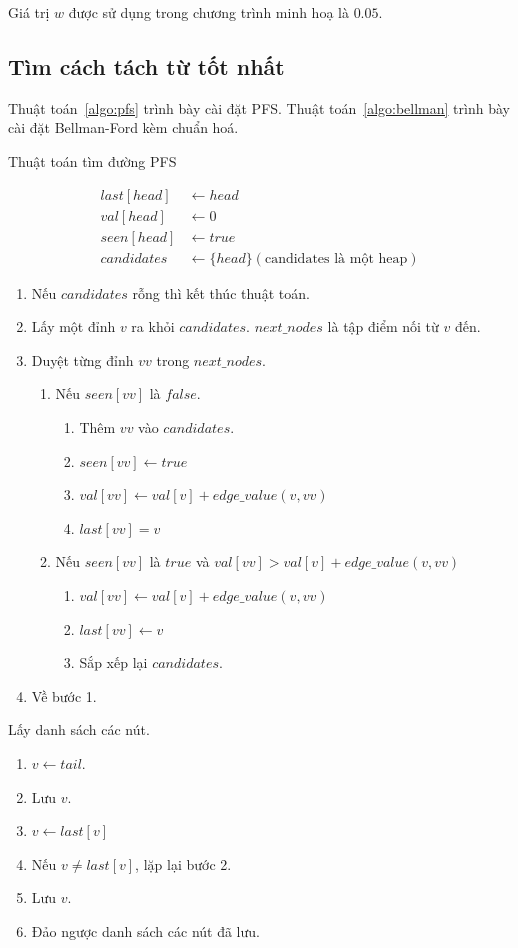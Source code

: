 \documentclass[a4paper,oneside,14pt]{extbook} %
\begin{document}
Giá trị $w$ được sử dụng trong chương trình minh hoạ là $0.05$. 


\subsection{Tìm cách tách từ tốt nhất}


Thuật toán~\ref{algo:pfs} trình bày cài đặt PFS. 
Thuật toán~\ref{algo:bellman} trình bày cài đặt Bellman-Ford kèm chuẩn hoá.


\begin{algo}
  \caption{Thuật toán tìm đường PFS}
  \label{algo:pfs}
  \begin{align*}
    last[head] &\leftarrow head\\
    val[head] &\leftarrow 0\\
    seen[head] &\leftarrow true\\
    candidates &\leftarrow \{ head \} (\text{candidates là một heap})
  \end{align*}

  \begin{enumerate}
  \item Nếu $candidates$ rỗng thì kết thúc thuật toán.
  \item Lấy một đỉnh $v$ ra khỏi $candidates$. $next\_nodes$ là tập điểm
    nối từ $v$ đến.
  \item Duyệt từng đỉnh $vv$ trong $next\_nodes$.
    \begin{enumerate}
    \item Nếu $seen[vv]$ là $false$.
      \begin{enumerate}
      \item Thêm $vv$ vào $candidates$.
      \item $seen[vv] \leftarrow true$
      \item $val[vv] \leftarrow val[v]+edge\_value(v,vv)$
      \item $last[vv] = v$
      \end{enumerate}
    \item Nếu $seen[vv]$ là $true$ và $val[vv] > val[v]+edge\_value(v,vv)$
      \begin{enumerate}
      \item $val[vv] \leftarrow val[v]+edge\_value(v,vv)$
      \item $last[vv] \leftarrow v$
      \item Sắp xếp lại $candidates$.
      \end{enumerate}
    \end{enumerate}
  \item Về bước 1.
  \end{enumerate}

Lấy danh sách các nút.
  \begin{enumerate}
  \item $v \leftarrow tail$.
  \item Lưu $v$.
  \item $v \leftarrow last[v]$
  \item Nếu $v \ne last[v]$, lặp lại bước 2.
  \item Lưu $v$.
  \item Đảo ngược danh sách các nút đã lưu.
  \end{enumerate}
\end{algo}
\end{document}
